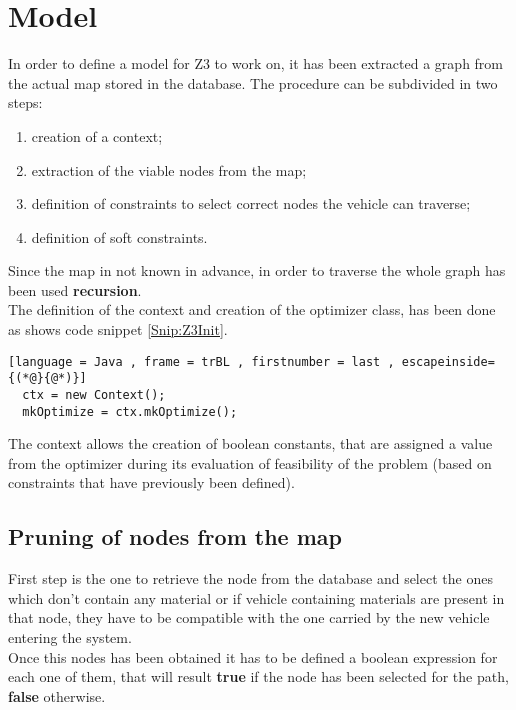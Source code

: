 
\section{Model}
In order to define a model for Z3 to work on, it has been extracted a graph from the actual map stored in the database. The procedure can be subdivided in two steps:
\begin{enumerate}
  \item creation of a context;
  \item extraction of the viable nodes from the map;
  \item definition of constraints to select correct nodes the vehicle can traverse;
  \item definition of soft constraints.
\end{enumerate}
Since the map in not known in advance, in order to traverse the whole graph has been used \textbf{recursion}.\\
The definition of the context and creation of the optimizer class, has been done as shows code snippet \ref{Snip:Z3Init}.
\begin{lstlisting}[language = Java , frame = trBL , firstnumber = last , escapeinside={(*@}{@*)}]
  ctx = new Context();
  mkOptimize = ctx.mkOptimize();
\end{lstlisting}
The context allows the creation of boolean constants, that are assigned a value from the optimizer during its evaluation of feasibility of the problem (based on constraints that have previously been defined).

\subsection{Pruning of nodes from the map}
First step is the one to retrieve the node from the database and select the ones which don't contain any material or if vehicle containing materials are present in that node, they have to be compatible with the one carried by the new vehicle entering the system.\\
Once this nodes has been obtained it has to be defined a boolean expression for each one of them, that will result \textbf{true} if the node has been selected for the path, \textbf{false} otherwise.\\

